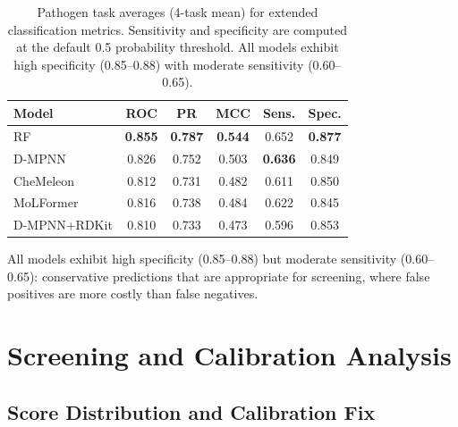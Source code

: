 \documentclass{article}
\begin{document}
\begin{table}[ht]
\caption{Pathogen task averages (4-task mean) for extended classification metrics. Sensitivity and specificity are computed at the default 0.5 probability threshold. All models exhibit high specificity (0.85--0.88) with moderate sensitivity (0.60--0.65).}
\label{tab:ext_path}
\centering
\scriptsize
\begin{tabular}{lccccc}
\toprule
\textbf{Model} & \textbf{ROC} & \textbf{PR} & \textbf{MCC} & \textbf{Sens.} & \textbf{Spec.} \\
\midrule
RF              & \textbf{0.855} & \textbf{0.787} & \textbf{0.544} & 0.652 & \textbf{0.877} \\
D-MPNN          & 0.826 & 0.752 & 0.503 & \textbf{0.636} & 0.849 \\
CheMeleon       & 0.812 & 0.731 & 0.482 & 0.611 & 0.850 \\
MoLFormer       & 0.816 & 0.738 & 0.484 & 0.622 & 0.845 \\
D-MPNN+RDKit    & 0.810 & 0.733 & 0.473 & 0.596 & 0.853 \\
\bottomrule
\end{tabular}
\end{table}

All models exhibit high specificity (0.85--0.88) but moderate sensitivity (0.60--0.65): conservative predictions that are appropriate for screening, where false positives are more costly than false negatives.


\section{Screening and Calibration Analysis}
\label{app:screening}

\subsection{Score Distribution and Calibration Fix}

\begin{table}[ht]
\caption{Selectivity score distribution (\textit{E.~coli}, $t{=}10$, all 6,739 Hub compounds).}
\label{tab:calibration_detail}
\centering
\scriptsize
{}
\end{table}
\end{document}
